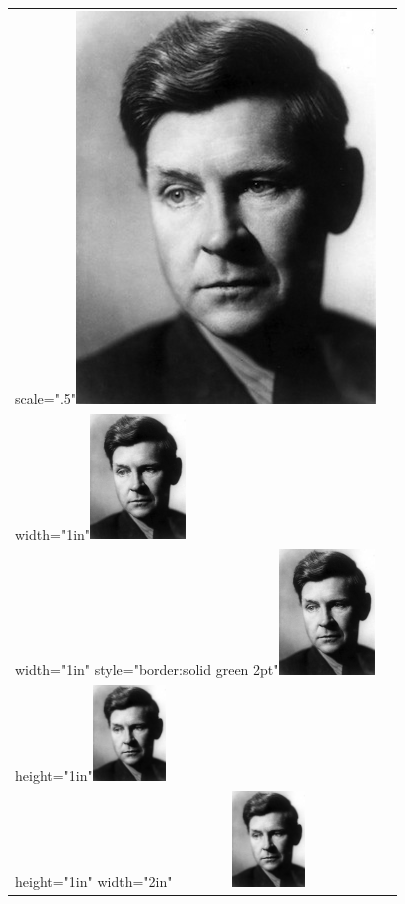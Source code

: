 \documentclass[11pt,twoside]{article}\makeatletter
\begin{document}
\begin{longtable}{P{0.19582814445828145\textwidth}P{0.6541718555417185\textwidth}}
scale=".5"\tabcellsep \noindent\includegraphics[scale=.5,]{portrait.jpg}\\
width="1in"\tabcellsep \noindent\includegraphics[width=1in,]{portrait.jpg}\\
width="1in" style="border:solid green 2pt"\tabcellsep \noindent\includegraphics[width=1in,]{portrait.jpg}\\
height="1in"\tabcellsep \noindent\includegraphics[height=1in,]{portrait.jpg}\\
height="1in" width="2in"\tabcellsep \noindent\includegraphics[width=2in,height=1in,]{portrait.jpg}\\

\end{longtable}
\end{document}
